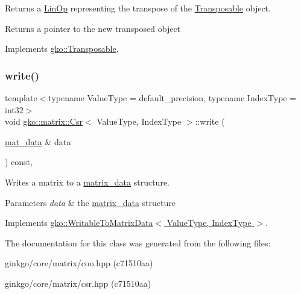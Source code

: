 Returns a \hyperlink{classgko_1_1LinOp}{Lin\+Op} representing the transpose of the \hyperlink{classgko_1_1Transposable}{Transposable} object. 

\begin{DoxyReturn}{Returns}
a pointer to the new transposed object 
\end{DoxyReturn}


Implements \hyperlink{classgko_1_1Transposable_a5c6b778b71b47d53e0bda6ccf894d318}{gko\+::\+Transposable}.

\mbox{\label{classgko_1_1matrix_1_1Csr_a205fc391f4cf4f7718a55b0a61f62bc9}} 
\subsubsection{\texorpdfstring{write()}{write()}}
{\footnotesize\ttfamily template$<$typename Value\+Type = default\+\_\+precision, typename Index\+Type = int32$>$ \\
void \hyperlink{classgko_1_1matrix_1_1Csr}{gko\+::matrix\+::\+Csr}$<$ Value\+Type, Index\+Type $>$\+::write (\begin{DoxyParamCaption}\item[{\hyperlink{structgko_1_1matrix__data}{mat\+\_\+data} \&}]{data }\end{DoxyParamCaption}) const\hspace{0.3cm}{\ttfamily [override]}, {\ttfamily [virtual]}}



Writes a matrix to a \hyperlink{structgko_1_1matrix__data}{matrix\+\_\+data} structure. 


\begin{DoxyParams}{Parameters}
{\em data} & the \hyperlink{structgko_1_1matrix__data}{matrix\+\_\+data} structure \\
\hline
\end{DoxyParams}


Implements \hyperlink{classgko_1_1WritableToMatrixData_a96036c3a4bf4c67fa93002808b8b14e2}{gko\+::\+Writable\+To\+Matrix\+Data$<$ Value\+Type, Index\+Type $>$}.



The documentation for this class was generated from the following files\+:\begin{DoxyCompactItemize}
\item 
ginkgo/core/matrix/coo.\+hpp (c71510aa)\item 
ginkgo/core/matrix/csr.\+hpp (c71510aa)\end{DoxyCompactItemize}
